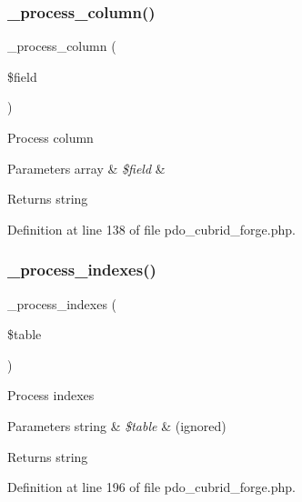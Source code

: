 \subsubsection{\texorpdfstring{\_process\_column()}{\_process\_column()}}
{\footnotesize\ttfamily \+\_\+process\+\_\+column (\begin{DoxyParamCaption}\item[{}]{\$field }\end{DoxyParamCaption})\hspace{0.3cm}{\ttfamily [protected]}}

Process column


\begin{DoxyParams}[1]{Parameters}
array & {\em \$field} & \\
\hline
\end{DoxyParams}
\begin{DoxyReturn}{Returns}
string 
\end{DoxyReturn}


Definition at line 138 of file pdo\+\_\+cubrid\+\_\+forge.\+php.

\mbox{\label{class_c_i___d_b__pdo__cubrid__forge_ae0bdb4ea3418590d1894c5b621b5ca50}} 
\subsubsection{\texorpdfstring{\_process\_indexes()}{\_process\_indexes()}}
{\footnotesize\ttfamily \+\_\+process\+\_\+indexes (\begin{DoxyParamCaption}\item[{}]{\$table }\end{DoxyParamCaption})\hspace{0.3cm}{\ttfamily [protected]}}

Process indexes


\begin{DoxyParams}[1]{Parameters}
string & {\em \$table} & (ignored) \\
\hline
\end{DoxyParams}
\begin{DoxyReturn}{Returns}
string 
\end{DoxyReturn}


Definition at line 196 of file pdo\+\_\+cubrid\+\_\+forge.\+php.



